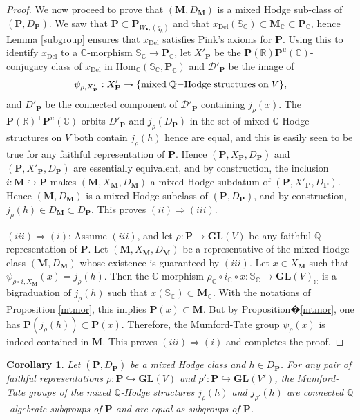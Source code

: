 \documentclass[10pt]{article}
\numberwithin{equation}{subsection}
\theoremstyle{plain}
\newtheorem{corollary}[theorem]{Corollary}
\theoremstyle{definition}
\theoremstyle{remark}
\newcommand{\Q}{\mathbb Q}
\newcommand{\C}{\mathbb C}
\newcommand{\R}{\mathbb R}
\newcommand{\s}{\mathbb S}
\newcommand{\pp}{\mathbf P}
\newcommand{\M}{\mathbf M}
\newcommand{\bul}{\bullet}
\newcommand{\Hom}{\mathrm{Hom}}
\newcommand{\gl}{\mathbf{GL}}
\newcommand{\Del}{\mathrm{Del}}
\newcommand{\ppol}{\pp_{W_\bul, (q_k)}}
\begin{document}
\begin{proof}
We now proceed to prove that $(\M,D_\M)$ is a mixed Hodge sub-class of $(\pp,D_\pp)$. We saw that $\pp \subset \ppol$ and that $x_\Del(\s_\C) \subset \M_\C \subset \pp_\C$, hence Lemma \ref{subgroup} ensures that $x_\Del$ satisfies Pink's axioms for $\pp$. Using this to identify $x_\Del$ to a $\C$-morphism $\s_\C \rightarrow \pp_\C$, let $X'_\pp$ be the $\pp(\R)\pp^u(\C)$-conjugacy class of $x_\Del$ in $\Hom_\C(\s_\C, \pp_\C)$ and $\mathcal{D'_\pp}$ be the image of 
\[
\psi_{\rho, X'_\pp} : X'_\pp \rightarrow  \{\mathrm{mixed} \hspace{0.1cm} \Q\mathrm{-Hodge} \hspace{0.1cm} \mathrm{structures} \hspace{0.1cm} \mathrm{on} \hspace{0.1cm} V\},
\] 
and $D'_\pp$ be the connected component of $\mathcal{D}'_\pp$ containing $j_\rho(x)$. The $\pp(\R)^+\pp^u(\C)$-orbits $D'_\pp$ and $j_\rho(D_\pp)$ in the set of mixed $\Q$-Hodge structures on $V$ both contain $j_\rho(h)$ hence are equal, and this is easily seen to be true for any faithful representation of $\pp$. Hence $(\pp, X_\pp, D_\pp)$ and $(\pp, X'_\pp, D_\pp)$ are essentially equivalent, and by construction, the inclusion $i : \M \hookrightarrow \pp$ makes $(\M, X_\M, D_\M)$ a mixed Hodge subdatum of $(\pp, X'_\pp, D_\pp)$. Hence $(\M,D_\M)$ is a mixed Hodge subclass of $(\pp, D_\pp)$, and by construction, $j_\rho(h) \in D_\M \subset D_\pp$. This proves $(ii) \Rightarrow (iii)$.

$(iii) \Rightarrow (i)$: Assume $(iii)$, and let $\rho : \pp \rightarrow \gl(V)$ be any faithful $\Q$-representation of $\pp$. Let $(\M, X_\M, D_\M)$ be a representative of the mixed Hodge class $(\M, D_\M)$ whose existence is guaranteed by $(iii)$. Let $x \in X_\M$ such that $\psi_{\rho\circ i, X_\M}(x) = j_\rho(h)$. Then the $\C$-morphism $\rho_\C \circ i_\C \circ x : \s_\C \rightarrow \gl(V)_\C$ is a bigraduation of $j_\rho(h)$  such that $x(\s_\C) \subset \M_\C$. With the notations of Proposition \ref{mtmor}, this implies $\pp(x) \subset \M$. But by Proposition�\ref{mtmor}, one has $\pp(j_\rho(h)) \subset \pp(x)$. Therefore, the Mumford-Tate group $\psi_\rho(x)$ is indeed contained in $\M$. This proves $(iii) \Rightarrow (i)$ and completes the proof.
\end{proof}
\begin{corollary}\label{mtindp}
Let $(\pp, D_\pp)$ be a mixed Hodge class and $h \in D_\pp$. For any pair of faithful representations $\rho : \pp \hookrightarrow \gl(V)$ and $\rho' : \pp \hookrightarrow \gl(V')$, the Mumford-Tate groups of the mixed $\Q$-Hodge structures $j_\rho(h)$ and $j_{\rho'}(h)$ are connected $\Q$-algebraic subgroups of $\pp$ and are equal as subgroups of $\pp$.
\end{corollary}
\end{document}
